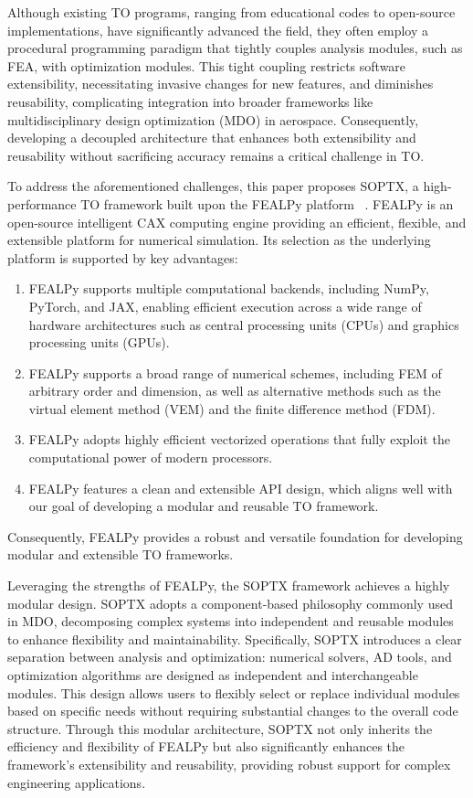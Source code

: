 \documentclass[mathpazo]{cicp}
\begin{document}
Although existing TO programs, ranging from educational codes to open-source implementations, have significantly advanced the field, they often employ a procedural programming paradigm that tightly couples analysis modules, such as FEA, with optimization modules. This tight coupling restricts software extensibility, necessitating invasive changes for new features, and diminishes reusability, complicating integration into broader frameworks like multidisciplinary design optimization (MDO) in aerospace. Consequently, developing a decoupled architecture that enhances both extensibility and reusability without sacrificing accuracy remains a critical challenge in TO.

To address the aforementioned challenges, this paper proposes SOPTX, a high-performance TO framework built upon the FEALPy platform ~\cite{fealpy}. FEALPy is an open-source intelligent CAX computing engine providing an efficient, flexible, and extensible platform for numerical simulation. Its selection as the underlying platform is supported by key advantages:
\vspace{-1ex}
\begin{enumerate}
	\item FEALPy supports multiple computational backends, including NumPy, PyTorch, and JAX, enabling efficient execution across a wide range of hardware architectures such as central processing units (CPUs) and graphics processing units (GPUs).
	\item FEALPy supports a broad range of numerical schemes, including FEM of arbitrary order and dimension, as well as alternative methods such as the virtual element method (VEM) and the finite difference method (FDM).
	\item FEALPy adopts highly efficient vectorized operations that fully exploit the computational power of modern processors.
	\item FEALPy features a clean and extensible API design, which aligns well with our goal of developing a modular and reusable TO framework.
\end{enumerate}
\vspace{-1ex}
Consequently, FEALPy provides a robust and versatile foundation for developing modular and extensible TO frameworks.

Leveraging the strengths of FEALPy, the SOPTX framework achieves a highly modular design. SOPTX adopts a component-based philosophy commonly used in MDO, decomposing complex systems into independent and reusable modules to enhance flexibility and maintainability. Specifically, SOPTX introduces a clear separation between analysis and optimization: numerical solvers, AD tools, and optimization algorithms are designed as independent and interchangeable modules. This design allows users to flexibly select or replace individual modules based on specific needs without requiring substantial changes to the overall code structure. Through this modular architecture, SOPTX not only inherits the efficiency and flexibility of FEALPy but also significantly enhances the framework’s extensibility and reusability, providing robust support for complex engineering applications.
\end{document}
